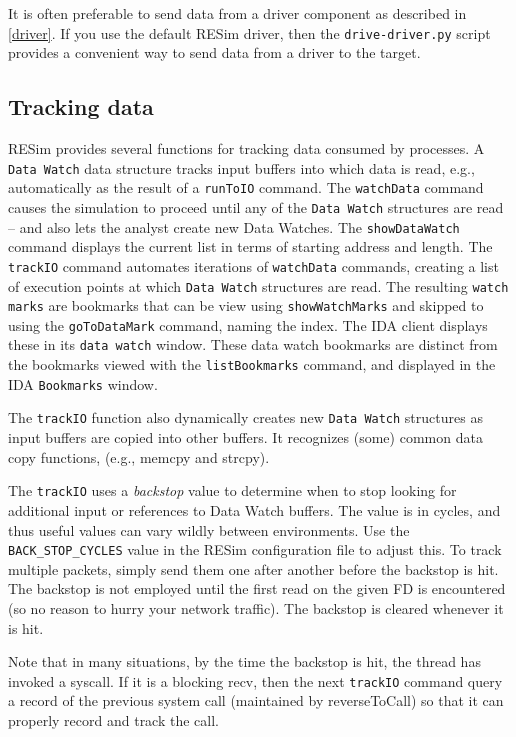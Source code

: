 \documentclass[titlepage]{article}
\begin{document}
It is often preferable to send data from a driver component as described in \ref{driver}.  If you use the default RESim driver, then the
{\tt drive-driver.py} script provides a convenient way to send data from a driver to the target.

\subsection{Tracking data}
\label{tracking}
RESim provides several functions for tracking data consumed by processes.  A {\tt Data Watch} data structure tracks input buffers into which
data is read, e.g., automatically as the result of a {\tt runToIO} command.  The {\tt watchData} command causes the simulation to proceed until any of the
{\tt Data Watch} structures are read -- and also lets the analyst create new Data Watches. The {\tt showDataWatch} command displays the current list in
terms of starting address and length. 
The {\tt trackIO} command automates iterations of {\tt watchData} commands, creating a list of execution
points at which {\tt Data Watch} structures are read. The resulting {\tt watch marks} are bookmarks that can be view using {\tt showWatchMarks} and
skipped to using the {\tt goToDataMark} command, naming the index.   
The IDA client displays these in its {\tt data watch} window.
These data watch bookmarks are distinct from the bookmarks viewed with the {\tt listBookmarks} command, and displayed in the IDA {\tt Bookmarks} window.

The {\tt trackIO} function also dynamically creates new {\tt Data Watch} structures as input buffers are copied into other buffers.  It recognizes (some) common
data copy functions, (e.g., memcpy and strcpy). 

The {\tt trackIO} uses a \textit{backstop} value to determine when to stop looking for additional input or references to Data Watch buffers.  The value is in 
cycles, and thus useful values can vary wildly between environments.  Use the {\tt BACK\_STOP\_CYCLES} value in the RESim configuration file to adjust this.
To track multiple packets, simply send them one after another before the backstop is hit.  The backstop is not employed until the first read on the given
FD is encountered (so no reason to hurry your network traffic).  The backstop is cleared whenever it is hit. 

Note that in many situations, by the time the backstop is hit, the thread has invoked a syscall.  If it is a blocking recv, then the next {\tt trackIO} 
command query a record of the previous system call (maintained by reverseToCall) so that it can properly record and track the call.
\end{document}
